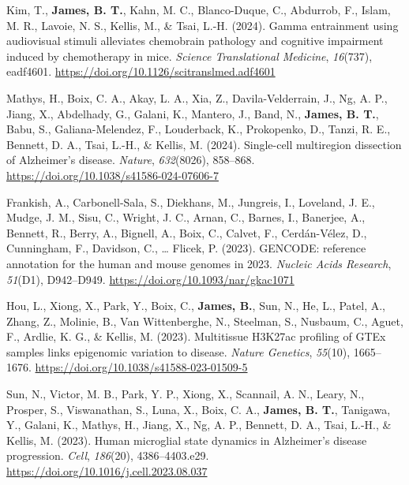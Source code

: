 \documentclass[letter,11pt]{article}
\begin{document}
		\item[\textbf{[J.6]}]{Kim, T., \textbf{James, B. T.}, Kahn, M. C., Blanco-Duque, C., Abdurrob, F., Islam, M. R., Lavoie, N. S., Kellis, M., \& Tsai, L.-H. (2024). Gamma entrainment using audiovisual stimuli alleviates chemobrain pathology and cognitive impairment induced by chemotherapy in mice. \textit{Science Translational Medicine}, \textit{16}(737), eadf4601. \url{https://doi.org/10.1126/scitranslmed.adf4601}}

		\item[\textbf{[J.7]}]{Mathys, H., Boix, C. A., Akay, L. A., Xia, Z., Davila-Velderrain, J., Ng, A. P., Jiang, X., Abdelhady, G., Galani, K., Mantero, J., Band, N., \textbf{James, B. T.}, Babu, S., Galiana-Melendez, F., Louderback, K., Prokopenko, D., Tanzi, R. E., Bennett, D. A., Tsai, L.-H., \& Kellis, M. (2024). Single-cell multiregion dissection of Alzheimer’s disease. \textit{Nature}, \textit{632}(8026), 858–868. \url{https://doi.org/10.1038/s41586-024-07606-7}}

		\item[\textbf{[J.8]}]{Frankish, A., Carbonell-Sala, S., Diekhans, M., Jungreis, I., Loveland, J. E., Mudge, J. M., Sisu, C., Wright, J. C., Arnan, C., Barnes, I., Banerjee, A., Bennett, R., Berry, A., Bignell, A., Boix, C., Calvet, F., Cerdán-Vélez, D., Cunningham, F., Davidson, C., … Flicek, P. (2023). GENCODE: reference annotation for the human and mouse genomes in 2023. \textit{Nucleic Acids Research}, \textit{51}(D1), D942–D949. \url{https://doi.org/10.1093/nar/gkac1071}}

		\item[\textbf{[J.9]}]{Hou, L., Xiong, X., Park, Y., Boix, C., \textbf{James, B.}, Sun, N., He, L., Patel, A., Zhang, Z., Molinie, B., Van Wittenberghe, N., Steelman, S., Nusbaum, C., Aguet, F., Ardlie, K. G., \& Kellis, M. (2023). Multitissue H3K27ac profiling of GTEx samples links epigenomic variation to disease. \textit{Nature Genetics}, \textit{55}(10), 1665–1676. \url{https://doi.org/10.1038/s41588-023-01509-5}}

		\item[\textbf{[J.10]}]{Sun, N., Victor, M. B., Park, Y. P., Xiong, X., Scannail, A. N., Leary, N., Prosper, S., Viswanathan, S., Luna, X., Boix, C. A., \textbf{James, B. T.}, Tanigawa, Y., Galani, K., Mathys, H., Jiang, X., Ng, A. P., Bennett, D. A., Tsai, L.-H., \& Kellis, M. (2023). Human microglial state dynamics in Alzheimer’s disease progression. \textit{Cell}, \textit{186}(20), 4386–4403.e29. \url{https://doi.org/10.1016/j.cell.2023.08.037}}
\end{document}
